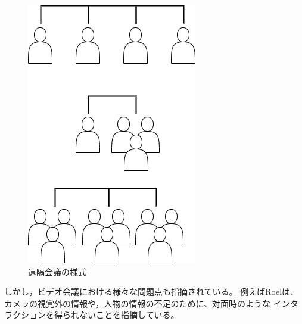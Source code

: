 \begin{figure}[tp]
  \centering
  \includegraphics[scale=0.7]{fig/conference.png}
  \caption{遠隔会議の様式}
\end{figure}

しかし，ビデオ会議における様々な問題点も指摘されている。
例えばRoel\cite{3}は、カメラの視覚外の情報や，人物の情報の不足のために、対面時のような
インタラクションを得られないことを指摘している。


